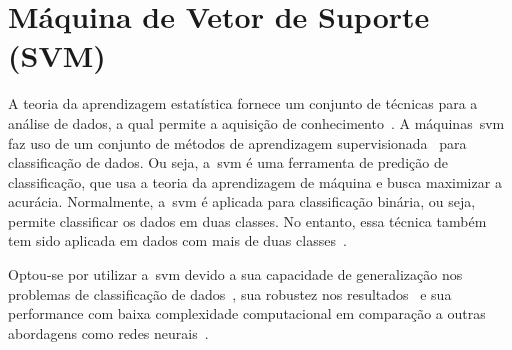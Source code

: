 \section{Máquina de Vetor de Suporte (SVM)}\label{sec:svm_linear}
A teoria da aprendizagem estatística fornece um conjunto de técnicas para a análise de dados, a qual permite a aquisição de conhecimento~\cite{vapnik95}. A máquinas~\ac{svm} faz uso de um conjunto de métodos de aprendizagem supervisionada~\cite{datamining2005} para classificação de dados. Ou seja, a~\ac{svm} é uma ferramenta de predição de classificação, que usa a teoria da aprendizagem de máquina e busca maximizar a acurácia. Normalmente, a~\ac{svm} é aplicada para classificação binária, ou seja, permite classificar os dados em duas classes. No entanto, essa técnica também tem sido aplicada em dados com mais de duas classes~\cite{multisvm2011}.

Optou-se por utilizar a~\ac{svm} devido a sua capacidade de generalização nos problemas de classificação de dados~\cite{vapnik95,xusvm2009}, sua robustez nos resultados~\cite{xusvm2009} e sua performance com baixa complexidade computacional em comparação a outras abordagens como redes neurais~\cite{comprnasvm2007}.


%

%
%



